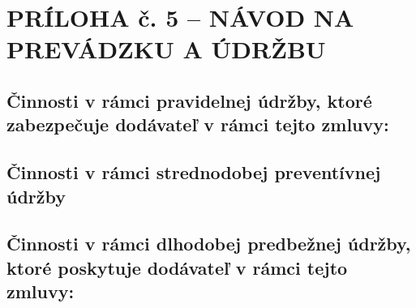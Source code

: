 \section{PRÍLOHA č. 5 {–} NÁVOD NA PREVÁDZKU A ÚDRŽBU}

\subsection{Činnosti v rámci pravidelnej údržby, ktoré zabezpečuje dodávateľ v rámci tejto zmluvy:}


\begin{center}
\end{center}

\subsection{Činnosti v rámci strednodobej preventívnej údržby}


\begin{center}
\end{center}

\subsection{Činnosti v rámci dlhodobej predbežnej údržby, ktoré poskytuje dodávateľ v rámci tejto zmluvy:}


